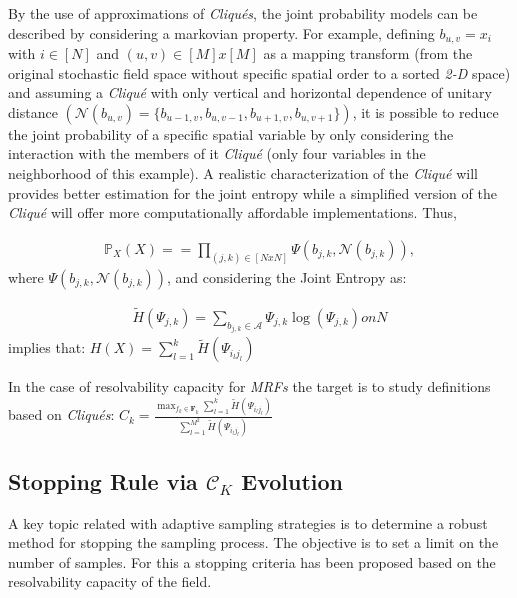 By the use of approximations of \emph{Cliqués}, the joint probability models can be described by considering a markovian property. For example, defining $b_{u,v} = x_{i}$ with $i \in [N]$ and $ (u,v) \in [M] x [M]$ as a mapping transform (from the original stochastic field space without specific spatial order to a sorted \emph{2-D} space) and assuming a \emph{Cliqué} with only vertical and horizontal dependence of unitary distance $\scriptstyle{(\mathcal{N}(b_{u,v}) = \lbrace b_{u-1,v}, b_{u,v-1}, b_{u+1,v}, b_{u,v+1} \rbrace )}$, it is possible to reduce the joint probability of a specific spatial variable by only considering the interaction with the members of it \emph{Cliqué} (only four variables in the neighborhood of this example). A realistic characterization of the \emph{Cliqué} will provides better estimation for the joint entropy while a simplified version of the \emph{Cliqué} will offer more computationally affordable implementations. Thus,

\begin{align}\label{eq:StopRule_P1_PEQ}
\mathds{P}_{X}(X) = = \prod_{(j,k) \in [N x N]}{\Psi(b_{j,k},\mathcal{N}(b_{j,k}))},
\end{align}
where $\Psi(b_{j,k},\mathcal{N}(b_{j,k}))$, and considering the Joint Entropy as:

\begin{align}\label{eq:StopRule_P2_PEQ}
\scriptstyle{\tilde{H}(\Psi_{j,k}) = \sum_{b_{j,k} \in \mathcal{A}}{\Psi_{j,k} \log( \Psi_{j,k} )} } on N
\end{align}
implies that: 
$H(X)  =  \displaystyle \sum_{l = 1}^{k}{\tilde{H}(\Psi_{i_lj_l})}$

In the case of resolvability capacity for \emph{MRFs} the target is to study definitions based on \emph{Cliqués}:
	$
	C_k  =  \displaystyle \frac{\displaystyle \max_{f_k \in \mathbf{F}_k} \displaystyle \sum_{l = 1}^{k}{\tilde{H}(\Psi_{i_lj_l})} }{\displaystyle \sum_{l = 1}^{M^2}{\tilde{H}(\Psi_{i_lj_l})}}
	$

\subsection{Stopping Rule via \texorpdfstring{$\mathcal{C}_{K}$ Evolution }{C\_K Evolution }  }
\label{sec_Meth_StopRules}

A key topic related with adaptive sampling strategies is to determine a robust method for stopping the sampling process. The objective is to set a limit on the number of samples. For this a stopping criteria has been proposed based on the resolvability capacity of the field. 

